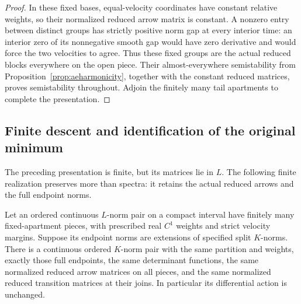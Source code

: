 \begin{proof}
In these fixed bases, equal-velocity coordinates have constant
relative weights, so their normalized reduced arrow matrix is
constant. A nonzero entry between distinct groups has strictly
positive norm gap at every interior time: an interior zero of
its nonnegative smooth gap would have zero derivative and would
force the two velocities to agree. Thus these fixed groups are
the actual reduced blocks everywhere on the open piece.
Their almost-everywhere semistability from
Proposition~\ref{prop:aeharmonicity}, together with the constant
reduced matrices, proves semistability throughout. Adjoin the
finitely many tail apartments to complete the presentation.
\end{proof}

\subsection{Finite descent and identification of the original minimum}
The preceding presentation is finite, but its matrices lie in $L$.
The following finite realization preserves more than spectra: it
retains the actual reduced arrows and the full endpoint norms.

\begin{lemma}\label{lem:finitecurvetransfer}
Let an ordered continuous $L$-norm pair on a compact interval have
finitely many fixed-apartment pieces, with prescribed real $C^1$
weights and strict velocity margins. Suppose its endpoint norms
are extensions of specified split $K$-norms. There is a continuous
ordered $K$-norm pair with the same partition and weights, exactly
those full endpoints, the same determinant functions, the same
normalized reduced arrow matrices on all pieces, and the same
normalized reduced transition matrices at their joins. In
particular its differential action is unchanged.
\end{lemma}

